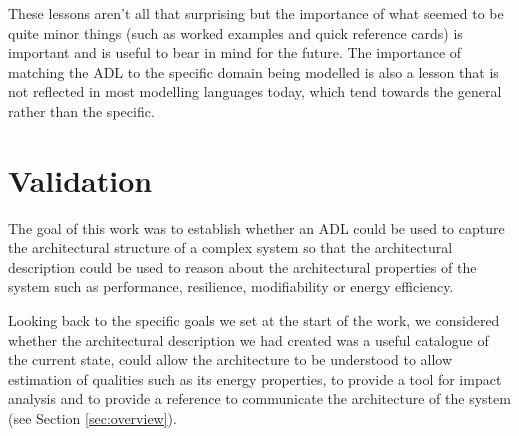   These lessons aren't all that surprising but the importance of what seemed to be quite minor things (such as worked examples and quick reference cards) is important and is useful to bear in mind for the future.  The importance of matching the ADL to the specific domain being modelled is also a lesson that is not reflected in most modelling languages today, which tend towards the general rather than the specific.  

  \section{Validation} 
  \label{section:adlvalidation} 

  The goal of this work was to establish whether an ADL could be used to capture the architectural structure of a complex system so that the architectural description could be used to reason about the architectural properties of the system such as performance, resilience, modifiability or energy efficiency.

  Looking back to the specific goals we set at the start of the work, we considered whether the architectural description we had created was a useful catalogue of the current state, could allow the architecture to be understood to allow estimation of qualities such as its energy properties, to provide a tool for impact analysis and to provide a reference to communicate the architecture of the system (see Section \ref{sec:overview}).
  
